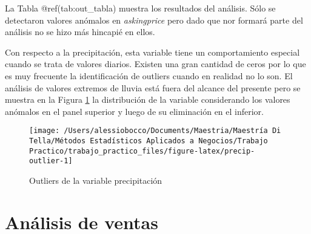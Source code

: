 \documentclass[
  12pt]{article}
\begin{document}
La Tabla @ref(tab:out\_tabla) muestra los resultados del análisis. Sólo se detectaron valores anómalos en \emph{askingprice} pero dado que nor formará parte del análisis no se hizo más hincapié en ellos.

\begin{table}[H]
\centering
{}
\end{table}

Con respecto a la precipitación, esta variable tiene un comportamiento especial cuando se trata de valores diarios. Existen una gran cantidad de ceros por lo que es muy frecuente la identificación de outliers cuando en realidad no lo son. El análisis de valores extremos de lluvia está fuera del alcance del presente pero se muestra en la Figura \ref{fig:precip-outlier} la distribución de la variable considerando los valores anómalos en el panel superior y luego de su eliminación en el inferior.

\begin{figure}

{\centering \texttt{[image: /Users/alessiobocco/Documents/Maestria/Maestría Di Tella/Métodos Estadísticos Aplicados a Negocios/Trabajo Practico/trabajo\_practico\_files/figure-latex/precip-outlier-1]} 

}

\caption{Outliers de la variable precipitación}\label{fig:precip-outlier}
\end{figure}

\hypertarget{anuxe1lisis-de-ventas}{%
\section{Análisis de ventas}\label{anuxe1lisis-de-ventas}}
\end{document}
